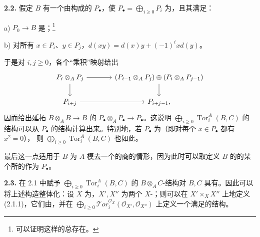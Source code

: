 \textbf{2.2.} 假定 $B$ 有一个由构成的 $P_\bullet$，使 $P_\bullet=\bigoplus_{i\geq0}P_i$ 为，且其满足：

 a) $P_0\to B$ 是；\footnote{可以证明这样的总存在。}

 b) 对所有 $x\in P_i$、$y\in P_j$，$d(xy)=d(x)y+(-1)^ixd(y)$。

于是对 $i,j\geq0$，各个“乘积”映射给出
\[
\begin{tikzcd}[column sep=large]
P_i\otimes_A P_j\arrow[r]\arrow[d]&
(P_{i-1}\otimes_A P_j)\oplus(P_i\otimes_A P_{j-1})\arrow[d]\\
P_{i+j}\arrow[r]&P_{i+j-1},
\end{tikzcd}
\]
因而给出延拓 $B\otimes_A B\to B$ 的 $P_\bullet\otimes_A P_\bullet\to P_\bullet$。这说明 $\bigoplus_{i\geq0}\operatorname{Tor}_i^A(B,C)$ 的结构可以从 $P_\bullet$ 的结构计算出来。特别地，若 $P_\bullet$ 为（即对每个 $x\in P_\bullet$ 都有 $x^2=0$），
则 $\bigoplus_{i\geq0}\operatorname{Tor}_i^A(B,C)$ 也如此。

最后这一点适用于 $B$ 为 $A$ 模去一个的商的情形，因为此时可以取定义 $B$ 的的某个所的作为 $P_\bullet$。

\textbf{2.3.} 在 2.1 中赋予 $\bigoplus_{i\geq0}\operatorname{Tor}_i^A(B,C)$ 的 $B\otimes_A C$-结构对 $B,C$ 具有。因此可以将上述构造整体化：设 $X$ 为，$X',X''$ 为两个 $X$-；则可以在 $X'\times_X X''$ 上地定义 (2.1.1)，它们由，并在 $\bigoplus_{i\geq0}\mathcal{T}or_i^{\mathcal O_X}(\mathcal O_{X'},\mathcal O_{X''})$ 上定义一个满足的结构。

